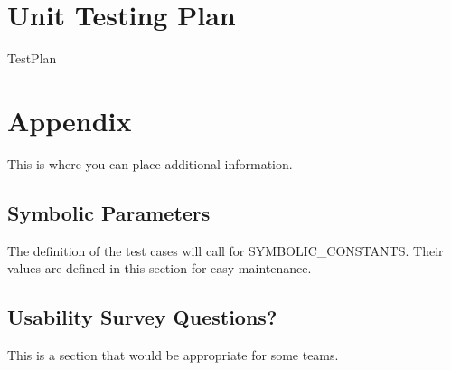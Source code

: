 \documentclass[12pt, titlepage]{article}
\begin{document}

					
					
					
					
					

					
					
					
					



				
\section{Unit Testing Plan}
		

 {TestPlan}

\newpage

\section{Appendix}

This is where you can place additional information.

\subsection{Symbolic Parameters}

The definition of the test cases will call for SYMBOLIC\_CONSTANTS.
Their values are defined in this section for easy maintenance.

\subsection{Usability Survey Questions?}

This is a section that would be appropriate for some teams.
\end{document}
